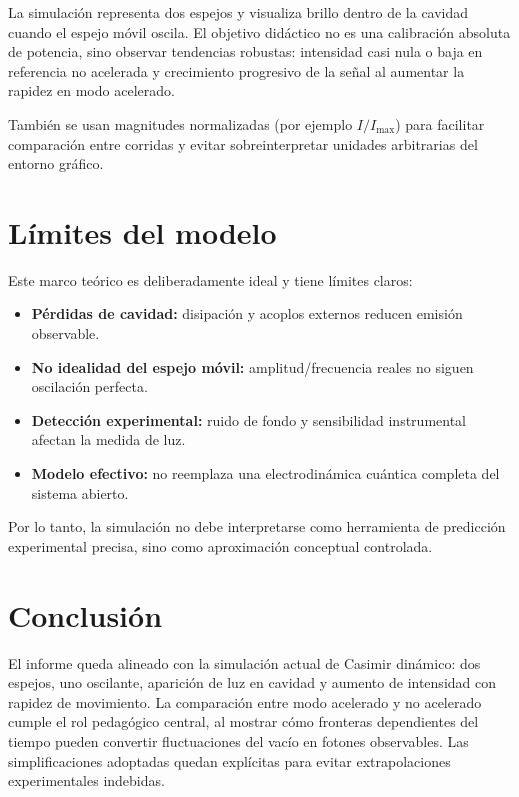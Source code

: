\documentclass{aa}
\begin{document}
La simulación representa dos espejos y visualiza brillo dentro de la cavidad cuando el espejo móvil oscila. El objetivo didáctico no es una calibración absoluta de potencia, sino observar tendencias robustas:
intensidad casi nula o baja en referencia no acelerada y crecimiento progresivo de la señal al aumentar la rapidez en modo acelerado.

También se usan magnitudes normalizadas (por ejemplo $I/I_{\max}$) para facilitar comparación entre corridas y evitar sobreinterpretar unidades arbitrarias del entorno gráfico.

\section{Límites del modelo}

Este marco teórico es deliberadamente ideal y tiene límites claros:
\begin{itemize}
  \item \textbf{Pérdidas de cavidad:} disipación y acoplos externos reducen emisión observable.
  \item \textbf{No idealidad del espejo móvil:} amplitud/frecuencia reales no siguen oscilación perfecta.
  \item \textbf{Detección experimental:} ruido de fondo y sensibilidad instrumental afectan la medida de luz.
  \item \textbf{Modelo efectivo:} no reemplaza una electrodinámica cuántica completa del sistema abierto.
\end{itemize}

Por lo tanto, la simulación no debe interpretarse como herramienta de predicción experimental precisa, sino como aproximación conceptual controlada.

\section{Conclusión}

El informe queda alineado con la simulación actual de Casimir dinámico: dos espejos, uno oscilante, aparición de luz en cavidad y aumento de intensidad con rapidez de movimiento.
La comparación entre modo acelerado y no acelerado cumple el rol pedagógico central, al mostrar cómo fronteras dependientes del tiempo pueden convertir fluctuaciones del vacío en fotones observables.
Las simplificaciones adoptadas quedan explícitas para evitar extrapolaciones experimentales indebidas.
\end{document}
